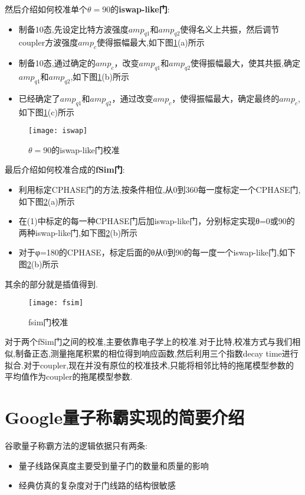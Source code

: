 然后介绍如何校准单个$\theta=90$的\textbf{iswap-like门}:
\begin{itemize}
	\item[1] 制备10态,先设定比特方波强度$amp_{q1}$和$amp_{q2}$使得名义上共振，然后调节coupler方波强度$amp_c$使得振幅最大,如下图\ref{iswap}(a)所示
	\item[2] 制备10态,通过确定的$amp_c$，改变$amp_{q1}$和$amp_{q2}$使得振幅最大，使其共振,确定$amp_{q1}$和$amp_{q2}$,如下图\ref{iswap}(b)所示
	\item[3] 已经确定了$amp_{q1}$和$amp_{q2}$，通过改变$amp_c$，使得振幅最大，确定最终的$amp_c$,如下图\ref{iswap}(c)所示
\end{itemize}
\begin{figure}
	\centering
	\texttt{[image: iswap]}
	\caption{$\theta=90$的iswap-like门校准} 
	\label{iswap}
\end{figure}

最后介绍如何校准合成的\textbf{fSim门}:
\begin{itemize}
\item[1] 利用标定CPHASE门的方法,按条件相位,从0到360每一度标定一个CPHASE门,如下图\ref{fsim}(a)所示
\item[2] 在(1)中标定的每一种CPHASE门后加iswap-like门，分别标定实现θ=0或90的两种iswap-like门,如下图\ref{fsim}(b)所示
\item[3] 对于φ=180的CPHASE，标定后面的θ从0到90的每一度一个iswap-like门,如下图\ref{fsim}(b)所示
\end{itemize}
其余的部分就是插值得到.
\begin{figure}
	\centering
	\texttt{[image: fsim]}
	\caption{fsim门校准} 
	\label{fsim}
\end{figure}


对于两个fSim门之间的校准,主要依靠电子学上的校准.对于比特,校准方式与我们相似,制备正态,测量拖尾积累的相位得到响应函数,然后利用三个指数decay time进行拟合.对于coupler,现在并没有原位的校准技术,只能将相邻比特的拖尾模型参数的平均值作为coupler的拖尾模型参数.


\section{Google量子称霸实现的简要介绍}
谷歌量子称霸方法的逻辑依据只有两条:
\begin{itemize}
	\item[1] 量子线路保真度主要受到量子门的数量和质量的影响	
	\item[2] 经典仿真的复杂度对于门线路的结构很敏感
\end{itemize}

